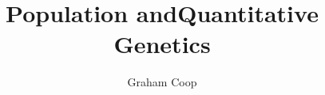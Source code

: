 

\newcommand{\E}{\mathbb{E}}
\renewcommand{\P}{\mathbb{P}}
\newcommand{\half}{\tfrac{1}{2}}

\newcommand{\wbar}{\overline{w}}
\newcommand{\eqn}{eqn}
\newcommand{\fis}{F_{\mathrm{IS}}}
\newcommand{\fit}{F_{\mathrm{IT}}}
\newcommand{\fst}{F_{\mathrm{ST}}}
\newcommand{\Wbar}{\overline{W}}
\newcommand{\dNdS}{\nicefrac{d_N}{d_S}}
\newcommand{\graham}[1]{\todo[size=\scriptsize, color=red!50]{#1}}

\newcommand{\nicefrac}[2]{\frac{#1}{#2}}


\title{Population and\newline Quantitative \newline Genetics}
\author{Graham Coop}


\date{}
\maketitle
\newpage











